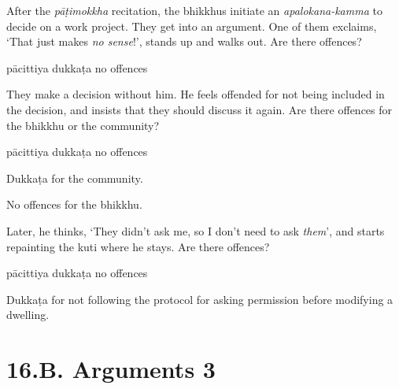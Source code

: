 \begin{exam}{\autoExamName}
  \begin{problem*}

    \begin{parts}

      \item After the \textit{pāṭimokkha} recitation, the bhikkhus initiate an
      \emph{apalokana-kamma} to decide on a work project. They get into an
      argument. One of them exclaims, `That just makes \textit{no sense}!',
      stands up and walks out. Are there offences?

      \bigskip

      \begin{answers}{3}
        \bChoices
         pācittiya\eAns
         dukkaṭa\eAns
         no offences\eAns
        \eChoices
      \end{answers}

      \clearpage

    \item They make a decision without him. He feels offended for not being
      included in the decision, and insists that they should discuss it again.
      Are there offences for the bhikkhu or the community?

      \bigskip

      \begin{answers}{3}
        \bChoices
         pācittiya\eAns
         dukkaṭa\eAns
         no offences\eAns
        \eChoices
      \end{answers}

      \begin{solution}
        Dukkaṭa for the community.

        No offences for the bhikkhu.
      \end{solution}

      \bigskip
  
    \item Later, he thinks, `They didn't ask me, so I don't need to ask
      \textit{them}', and starts repainting the kuti where he stays.
      Are there offences?

      \bigskip

      \begin{answers}{3}
        \bChoices
         pācittiya\eAns
         dukkaṭa\eAns
         no offences\eAns
        \eChoices
      \end{answers}

      \begin{solution}
        Dukkaṭa for not following the protocol for asking permission before
        modifying a dwelling.
      \end{solution}

    \end{parts}

  \end{problem*}

\end{exam}

\chapter{16.B. Arguments 3}
\renewcommand*{\theChapterTitle}{16.B. Arguments 3}
